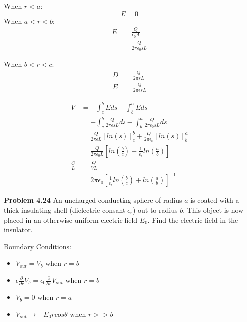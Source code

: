 \documentclass{article}
\begin{document}
When $r < a$:
$$E = 0$$ 
When $a < r < b$:
\begin{equation*}
\begin{split}
	E & = \frac{Q}{\epsilon_0 A} \\
	& = \frac{Q}{2 \pi \epsilon_0 s L}
\end{split}
\end{equation*}

When $b < r < c$:
\begin{equation*}
\begin{split}
	D & = \frac{Q}{2 \pi s L} \\
	E & = \frac{Q}{2 \pi \epsilon s L}
\end{split}
\end{equation*}

\begin{equation*}
\begin{split}
	V & = - \int_c^b E ds - \int_b^a E ds \\
	& = - \int_c^b \frac{Q}{2 \pi \epsilon s L} ds - \int_b^a \frac{Q}{2 \pi \epsilon_0 s L} ds \\
	& = \frac{Q}{2 \pi \epsilon L} [ln(s)]_c^b + \frac{Q}{2 \pi \epsilon_0} [ln(s)]_b^a \\
	& = \frac{Q}{2 \pi \epsilon_0 L} [ln(\frac{b}{c}) + \frac{1}{\epsilon_r} ln(\frac{a}{b})] \\
	\frac{C}{L} & = \frac{Q}{V L} \\
	& = \boxed{2 \pi \epsilon_0 [\frac{1}{\epsilon_r} ln(\frac{b}{c}) + ln(\frac{a}{b})]^{-1}}
\end{split}
\end{equation*}

\textbf{Problem 4.24}
An uncharged conducting sphere of radius $a$ is coated with a thick insulating shell (dielectric consant $\epsilon_r$) out to radius $b$.
This object is now placed in an otherwise uniform electric field $E_0$.
Find the electric field in the insulator.

Boundary Conditions:
\begin{itemize}
	\item $V_{out} = V_b$ when $r = b$
	\item $\epsilon \frac{\partial}{\partial r} V_{b} = \epsilon_0 \frac{\partial}{\partial r} V_{out}$ when $r = b$
	\item $V_b = 0$ when $r = a$
	\item $V_{out} \rightarrow -E_0 r cos\theta$ when $r >> b$
\end{itemize}
\end{document}
